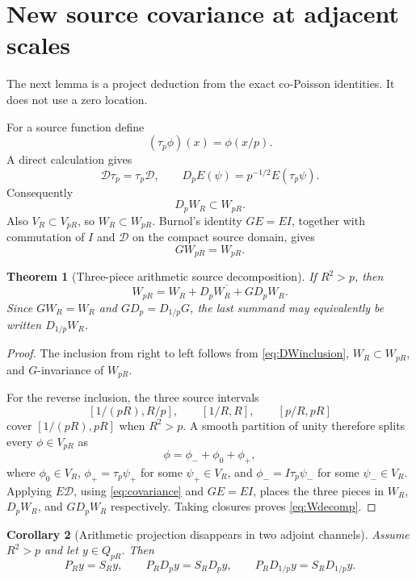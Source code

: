 \documentclass[11pt]{article}
\newtheorem{theorem}{Theorem}[section]
\newtheorem{corollary}[theorem]{Corollary}
\theoremstyle{remark}
\begin{document}
\section{New source covariance at adjacent scales}
The next lemma is a project deduction from the exact co-Poisson identities. It does not use a zero location.

For a source function define
\[
 (\tau_p\phi)(x)=\phi(x/p).
\]
A direct calculation gives
\begin{equation}\label{eq:covariance}
 \mathcal D\tau_p=\tau_p\mathcal D,
 \qquad
 D_pE(\psi)=p^{-1/2}E(\tau_p\psi).
\end{equation}
Consequently
\begin{equation}\label{eq:DWinclusion}
 D_pW_R\subset W_{pR}.
\end{equation}
Also $V_R\subset V_{pR}$, so $W_R\subset W_{pR}$. Burnol's identity $GE=EI$, together with commutation of $I$ and $\mathcal D$ on the compact source domain, gives
\[
 GW_{pR}=W_{pR}.
\]

\begin{theorem}[Three-piece arithmetic source decomposition]\label{thm:threepiece}
If $R^2>p$, then
\begin{equation}\label{eq:Wdecomp}
 W_{pR}=\overline{W_R+D_pW_R+GD_pW_R}.
\end{equation}
Since $GW_R=W_R$ and $GD_p=D_{1/p}G$, the last summand may equivalently be written $D_{1/p}W_R$.
\end{theorem}

\begin{proof}
The inclusion from right to left follows from \eqref{eq:DWinclusion}, $W_R\subset W_{pR}$, and $G$-invariance of $W_{pR}$.

For the reverse inclusion, the three source intervals
\[
 [1/(pR),R/p],\qquad [1/R,R],\qquad [p/R,pR]
\]
cover $[1/(pR),pR]$ when $R^2>p$. A smooth partition of unity therefore splits every $\phi\in V_{pR}$ as
\[
 \phi=\phi_-+\phi_0+\phi_+,
\]
where $\phi_0\in V_R$, $\phi_+=\tau_p\psi_+$ for some $\psi_+\in V_R$, and $\phi_-=I\tau_p\psi_-$ for some $\psi_-\in V_R$. Applying $E\mathcal D$, using \eqref{eq:covariance} and $GE=EI$, places the three pieces in $W_R$, $D_pW_R$, and $GD_pW_R$ respectively. Taking closures proves \eqref{eq:Wdecomp}.
\end{proof}

\begin{corollary}[Arithmetic projection disappears in two adjoint channels]\label{cor:projectiondrop}
Assume $R^2>p$ and let $y\in Q_{pR}$. Then
\begin{equation}\label{eq:drop}
 P_Ry=S_Ry,\qquad
 P_RD_py=S_RD_py,\qquad
 P_RD_{1/p}y=S_RD_{1/p}y.
\end{equation}
\end{corollary}
\end{document}
